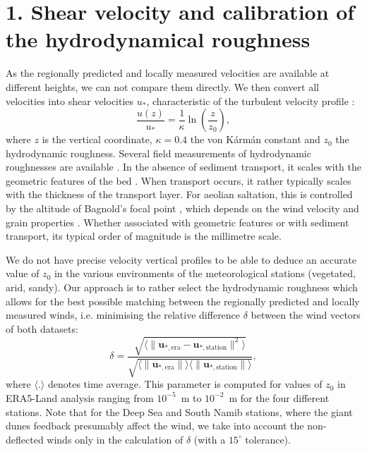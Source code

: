\section*{1. Shear velocity and calibration of the hydrodynamical roughness}
\label{calib_z0}

As the regionally predicted and locally measured velocities are available at different heights, we can not compare them directly. We then convert all velocities into shear velocities $u_{*}$, characteristic of the turbulent velocity profile \citep{Spalding1961, Stull1988}:
%
\begin{equation}
\frac{u(z)}{u_{*}} = \frac{1}{\kappa}\ln\left(\frac{z}{z_{0}}\right),
\end{equation}
%
where $z$ is the vertical coordinate, $\kappa = 0.4$ the von K\'arm\'an constant and $z_{0}$ the hydrodynamic roughness. Several field measurements of hydrodynamic roughnesses are available . In the absence of sediment transport, it scales with the geometric features of the bed \citep{Pelletier2016} . When transport occurs, it rather typically scales with the thickness of the transport layer. For aeolian saltation, this is controlled by the altitude of Bagnold's focal point \citep{Duran2011,Valance2015}, which depends on the wind velocity and grain properties \citep{Sherman2008, Zhang2016, Field2018}. Whether associated with geometric features or with sediment transport, its typical order of magnitude is the millimetre scale.

We do not have precise velocity vertical profiles to be able to deduce an accurate value of $z_0$ in the various environments of the meteorological stations (vegetated, arid, sandy). Our approach is to rather select the hydrodynamic roughness which allows for the best possible matching between the regionally predicted and locally measured winds, i.e. minimising the relative difference $\delta$ between the wind vectors of both datasets:
%
\begin{equation}
\label{metric_roughness}
\delta = \frac{\sqrt{\langle\| \boldsymbol{u}_{*, \textrm{era}} - \boldsymbol{u}_{*, \textrm{station}} \|^{2}\rangle}}{\sqrt{ \langle \| \boldsymbol{u}_{*, \textrm{era}} \| \rangle \langle \| \boldsymbol{u}_{*, \textrm{station}} \| \rangle}} ,
\end{equation}
%
where $\langle.\rangle$ denotes time average. This parameter is computed for values of $z_0$ in ERA5-Land analysis ranging from $10^{-5}$~m to $10^{-2}$~m for the four different stations. Note that for the Deep Sea and South Namib stations, where the giant dunes feedback presumably affect the wind, we take into account the non-deflected winds only in the calculation of $\delta$ (with a $15^\circ$ tolerance).


